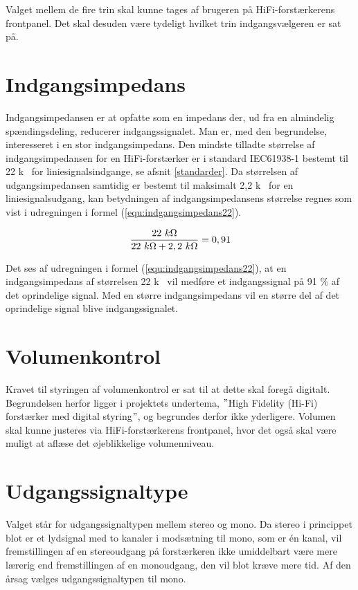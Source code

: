Valget mellem de fire trin skal kunne tages af brugeren på HiFi-forstærkerens frontpanel. Det skal desuden være tydeligt hvilket trin indgangsvælgeren er sat på.

\section{Indgangsimpedans}
\label{valg_indgangsimpedans}
Indgangsimpedansen er at opfatte som en impedans der, ud fra en almindelig spændingsdeling, reducerer indgangssignalet. Man er, med den begrundelse, interesseret i en stor indgangsimpedans. Den mindste tilladte størrelse af indgangsimpedansen for en HiFi-forstærker er i standard IEC61938-1 bestemt til 22 k\ohm~ for liniesignalsindgange, se afsnit \ref{standarder}. Da størrelsen af udgangsimpedansen samtidig er bestemt til maksimalt 2,2 k\ohm~ for en liniesignalsudgang, kan betydningen af indgangsimpedansens størrelse regnes som vist i udregningen i formel (\ref{equ:indgangsimpedans22}). 

\begin{equation}
\label{equ:indgangsimpedans22}
\frac{22~k\ohm}{22~k\ohm + 2,2~k\ohm} = 0,91
\end{equation}

Det ses af udregningen i formel (\ref{equ:indgangsimpedans22}), at en indgangsimpedans af størrelsen 22 k\ohm~ vil medføre et indgangssignal på 91 \% af det oprindelige signal. Med en større indgangsimpedans vil en større del af det oprindelige signal blive indgangssignalet. 

\section{Volumenkontrol}
\label{valg_volumenkontrol}
Kravet til styringen af volumenkontrol er sat til at dette skal foregå digitalt. Begrundelsen herfor ligger i projektets undertema, $"$High Fidelity (Hi-Fi) forstærker med digital styring$"$, og begrundes derfor ikke yderligere. Volumen skal kunne justeres via HiFi-forstærkerens frontpanel, hvor det også skal være muligt at aflæse det øjeblikkelige volumenniveau.  

\section{Udgangssignaltype}
\label{valg_udgangssignaltype}
Valget står for udgangssignaltypen mellem stereo og mono. Da stereo i princippet blot er et lydsignal med to kanaler i modsætning til mono, som er én kanal, vil fremstillingen af en stereoudgang på forstærkeren ikke umiddelbart være mere lærerig end fremstillingen af en monoudgang, den vil blot kræve mere tid. Af den årsag vælges udgangssignaltypen til mono.

